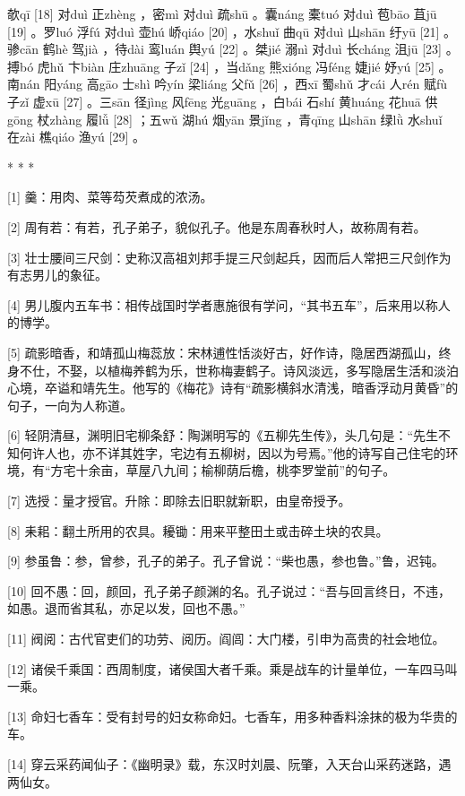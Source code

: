 \documentclass[12pt,UTF8]{ctexbook}
\begin{document}
欹qī [18] 对duì 正zhèng ，密mì 对duì 疏shū 。囊náng 橐tuó 对duì 苞bāo 苴jū [19] 。罗luó 浮fú 对duì 壶hú 峤qiáo [20] ，水shuǐ 曲qū 对duì 山shān 纡yū [21] 。骖cān 鹤hè 驾jià ，待dài 鸾luán 舆yú [22] 。桀jié 溺nì 对duì 长cháng 沮jū [23] 。搏bó 虎hǔ 卞biàn 庄zhuāng 子zǐ [24] ，当dǎng 熊xióng 冯féng 婕jié 妤yú [25] 。南nán 阳yáng 高gāo 士shì 吟yín 梁liáng 父fǔ [26] ，西xī 蜀shǔ 才cái 人rén 赋fù 子zǐ 虚xū [27] 。三sān 径jìng 风fēng 光guāng ，白bái 石shí 黄huáng 花huā 供gōng 杖zhàng 履lǚ [28] ；五wǔ 湖hú 烟yān 景jǐng ，青qīng 山shān 绿lǜ 水shuǐ 在zài 樵qiáo 渔yú [29] 。



* * *



[1] 羹：用肉、菜等芶芡煮成的浓汤。

[2] 周有若：有若，孔子弟子，貌似孔子。他是东周春秋时人，故称周有若。

[3] 壮士腰间三尺剑：史称汉高祖刘邦手提三尺剑起兵，因而后人常把三尺剑作为有志男儿的象征。

[4] 男儿腹内五车书：相传战国时学者惠施很有学问，“其书五车”，后来用以称人的博学。

[5] 疏影暗香，和靖孤山梅蕊放：宋林逋性恬淡好古，好作诗，隐居西湖孤山，终身不仕，不娶，以植梅养鹤为乐，世称梅妻鹤子。诗风淡远，多写隐居生活和淡泊心境，卒谥和靖先生。他写的《梅花》诗有“疏影横斜水清浅，暗香浮动月黄昏”的句子，一向为人称道。

[6] 轻阴清昼，渊明旧宅柳条舒：陶渊明写的《五柳先生传》，头几句是：“先生不知何许人也，亦不详其姓字，宅边有五柳树，因以为号焉。”他的诗写自己住宅的环境，有“方宅十余亩，草屋八九间；榆柳荫后檐，桃李罗堂前”的句子。

[7] 选授：量才授官。升除：即除去旧职就新职，由皇帝授予。

[8] 耒耜：翻土所用的农具。耰锄：用来平整田土或击碎土块的农具。

[9] 参虽鲁：参，曾参，孔子的弟子。孔子曾说：“柴也愚，参也鲁。”鲁，迟钝。

[10] 回不愚：回，颜回，孔子弟子颜渊的名。孔子说过：“吾与回言终日，不违，如愚。退而省其私，亦足以发，回也不愚。”

[11] 阀阅：古代官吏们的功劳、阅历。阎闾：大门楼，引申为高贵的社会地位。

[12] 诸侯千乘国：西周制度，诸侯国大者千乘。乘是战车的计量单位，一车四马叫一乘。

[13] 命妇七香车：受有封号的妇女称命妇。七香车，用多种香料涂抹的极为华贵的车。

[14] 穿云采药闻仙子：《幽明录》载，东汉时刘晨、阮肇，入天台山采药迷路，遇两仙女。
\end{document}
